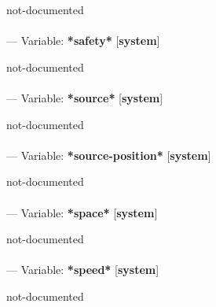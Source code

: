 \begin{adjustwidth}{5em}{5em}
not-documented
\end{adjustwidth}

\paragraph{}
\label{SYSTEM:*SAFETY*}
--- Variable: \textbf{*safety*} [\textbf{system}] \textit{}

\begin{adjustwidth}{5em}{5em}
not-documented
\end{adjustwidth}

\paragraph{}
\label{SYSTEM:*SOURCE*}
--- Variable: \textbf{*source*} [\textbf{system}] \textit{}

\begin{adjustwidth}{5em}{5em}
not-documented
\end{adjustwidth}

\paragraph{}
\label{SYSTEM:*SOURCE-POSITION*}
--- Variable: \textbf{*source-position*} [\textbf{system}] \textit{}

\begin{adjustwidth}{5em}{5em}
not-documented
\end{adjustwidth}

\paragraph{}
\label{SYSTEM:*SPACE*}
--- Variable: \textbf{*space*} [\textbf{system}] \textit{}

\begin{adjustwidth}{5em}{5em}
not-documented
\end{adjustwidth}

\paragraph{}
\label{SYSTEM:*SPEED*}
--- Variable: \textbf{*speed*} [\textbf{system}] \textit{}

\begin{adjustwidth}{5em}{5em}
not-documented
\end{adjustwidth}

